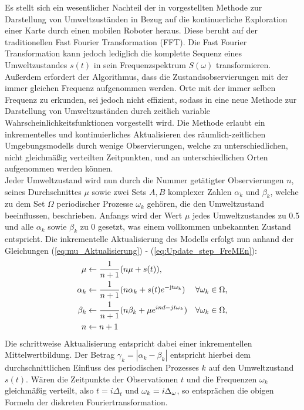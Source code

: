 Es stellt sich ein wesentlicher Nachteil der in \cite{Krajnik.2014} vorgestellten Methode zur Darstellung von Umweltzuständen in Bezug auf die kontinuerliche Exploration einer Karte durch einen mobilen Roboter heraus. Diese beruht auf der traditionellen Fast Fourier Transformation (FFT). Die Fast Fourier Transformation kann jedoch lediglich die komplette Sequenz eines Umweltzustandes $s(t)$ in sein Frequenzspektrum $S(\omega)$ transformieren. Außerdem erfordert der Algorithmus, dass die Zustandsobservierungen mit der immer gleichen Frequenz aufgenommen werden.  Orte mit der immer selben Frequenz zu erkunden, sei jedoch nicht effizient, sodass in \cite{Krajnik.2015} eine neue Methode zur Darstellung von Umweltzuständen durch zeitlich variable Wahrscheinlichkeitsfunktionen vorgestellt wird. Die Methode erlaubt ein inkrementelles und kontinuierliches Aktualisieren des räumlich-zeitlichen Umgebungsmodells durch wenige Observierungen, welche zu unterschiedlichen, nicht gleichmäßig verteilten Zeitpunkten, und an unterschiedlichen Orten aufgenommen werden können. \\
Jeder Umweltzustand wird nun durch die Nummer getätigter Observierungen $n$, seines Durchschnittes $\mu$ sowie zwei Sets $A,B$ komplexer Zahlen $\alpha_k$ und $\beta_k$, welche zu dem Set $\Omega$ periodischer Prozesse $\omega_k$ gehören, die den Umweltzustand beeinflussen, beschrieben. Anfangs wird der Wert $\mu$ jedes Umweltzustandes zu 0.5 und alle $\alpha_k$ sowie $\beta_k$ zu 0 gesetzt, was einem vollkommen unbekannten Zustand entspricht. Die inkrementelle Aktualisierung des Modells erfolgt nun anhand der Gleichungen (\ref{eq:mu_Aktualisierung}) - (\ref{eq:Update_step_FreMEn}):
\begin{align}
	\label{eq:mu_Aktualisierung}
	\mu &\leftarrow \frac{1}{n+1}(n \mu + s(t)), \\
	\alpha_k &\leftarrow \frac{1}{n+1} (n \alpha_k + s(t) e^{\mathrm{-jt\omega_k}})  &\forall \omega_k \in \Omega, \\
	\beta_k &\leftarrow \frac{1}{n+1} (n \beta_k + \mu e^{ind{-jt\omega_k}})  &\forall \omega_k \in \Omega, \\
	n &\leftarrow n + 1
	\label{eq:Update_step_FreMEn}
\end{align}
Die schrittweise Aktualisierung entspricht dabei einer inkrementellen Mittelwertbildung. Der Betrag $\gamma_k = |\alpha_k - \beta_k|$ entspricht hierbei dem durchschnittlichen Einfluss des periodischen Prozesses $k$ auf den Umweltzustand $s(t)$.
Wären die Zeitpunkte der Observationen $t$ und die Frequenzen $\omega_k$ gleichmäßig verteilt, also $t=i\Delta_t$ und $\omega_k = i\Delta_{\mathrm{\omega}}$, so entsprächen die obigen Formeln der diskreten Fouriertransformation.
